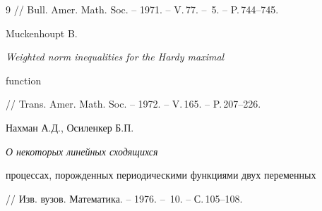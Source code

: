 \begin{thebibliography}{9}
// Bull. Amer. Math. Soc. -- 1971. -- V.\,77. -- \No\,5. -- P.\,744--745.




Muckenhoupt B. {\em Weighted norm inequalities for the Hardy maximal


function} // Trans. Amer. Math. Soc. -- 1972. -- V.\,165. -- P.\,207--226.




Нахман А.Д., Осиленкер Б.П. {\em О некоторых линейных сходящихся


процессах, порожденных периодическими функциями двух переменных} 


// Изв. вузов. Математика. -- 1976. -- \No\,10. -- С.\,105--108.





\end{thebibliography}





\vskip 2cm












\label{end}





